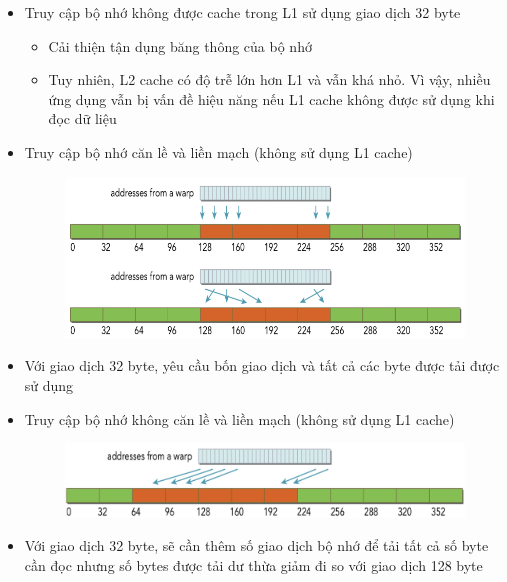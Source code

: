 \documentclass[14pt, a4paper]{article}
\numberwithin{equation}{section}
\numberwithin{figure}{section}
\numberwithin{dl}{section}
\numberwithin{md}{section}
\numberwithin{bd}{section}
\numberwithin{dn}{section}
\numberwithin{hq}{section}
\begin{document}
\begin{itemize}
    \item Truy cập bộ nhớ không được cache trong L1 sử dụng giao dịch 32 byte
    \begin{itemize}
        \item Cải thiện tận dụng băng thông của bộ nhớ
        \item Tuy nhiên, L2 cache có độ trễ lớn hơn L1 và vẫn khá nhỏ.
        Vì vậy, nhiều ứng dụng vẫn bị vấn đề hiệu năng nếu L1 cache không được sử dụng khi đọc dữ liệu
    \end{itemize}
\end{itemize}

\begin{itemize}
    \item Truy cập bộ nhớ căn lề và liền mạch (không sử dụng L1 cache)
    \begin{figure}[H]
        \centering
        \includegraphics[width=0.7\linewidth]{figures/CUDA/Aligned_Coalesced_Global_Memory_Transaction_2.png}
    \end{figure}
    \item Với giao dịch 32 byte, yêu cầu bốn giao dịch và tất cả các byte được tải được sử dụng
\end{itemize}

\begin{itemize}
    \item Truy cập bộ nhớ không căn lề và liền mạch (không sử dụng L1 cache)
    \begin{figure}[H]
        \centering
        \includegraphics[width=0.7\linewidth]{figures/CUDA/Misaligned_Coalesced_Global_Memory_Transaction_2.png}
    \end{figure}
    \item Với giao dịch 32 byte, sẽ cần thêm số giao dịch bộ nhớ để tải tất cả số byte cần đọc nhưng số bytes được tải dư thừa giảm đi so với giao dịch 128 byte
\end{itemize}
\end{document}
